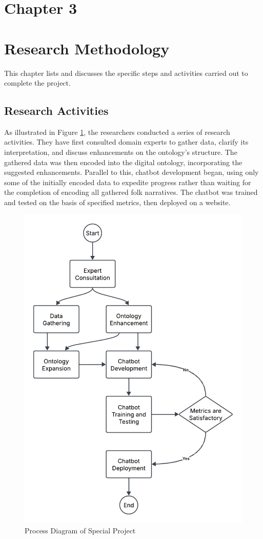 \section*{Chapter 3}
\section{Research Methodology}
This chapter lists and discusses the specific steps and activities carried out to complete the project. 

\subsection{Research Activities}

As illustrated in Figure \ref{fig:process diagram}, the researchers conducted a series of research activities. They have first consulted domain experts to gather data, clarify its interpretation, and discuss enhancements on the ontology’s structure. The gathered data was then encoded into the digital ontology, incorporating the suggested enhancements. Parallel to this, chatbot development  began, using only some of the initially encoded data to expedite progress rather than waiting for the completion of encoding all gathered folk narratives. The chatbot was trained and tested on the basis of specified metrics, then deployed on a website.

\begin{figure}[H]
    \centering
    \includegraphics[width=0.8\linewidth]{figures/Process Diagram of Special Project.png}
    \caption{Process Diagram of Special Project}
    \label{fig:process diagram}
\end{figure}

